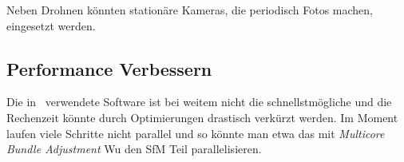 			Neben Drohnen könnten stationäre Kameras, die periodisch Fotos machen, eingesetzt werden.

		\subsection{Performance Verbessern}
			Die in \dronarch\ verwendete Software ist bei weitem nicht die schnellstmögliche und die Rechenzeit könnte durch Optimierungen drastisch verkürzt werden. Im Moment laufen viele Schritte nicht parallel und so könnte man etwa das mit \emph{Multicore Bundle Adjustment} Wu \etal{} den SfM Teil parallelisieren.
	